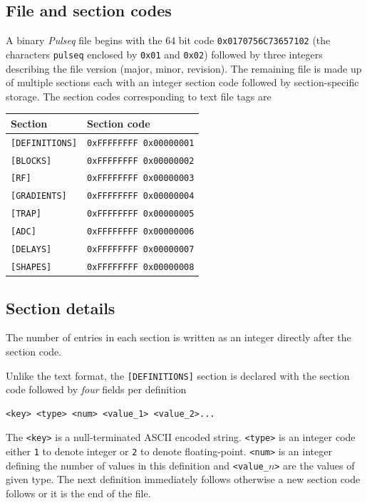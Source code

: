 \documentclass{article}
\begin{document}
\subsection{File and section codes}

A binary \textit{Pulseq} file begins with the 64 bit code \verb.0x0170756C73657102. (the characters \verb.pulseq. enclosed by \verb.0x01. and \verb.0x02.)  followed by three integers describing the file version (major, minor, revision). The remaining file is made up of multiple sections each with an integer section code followed by section-specific storage. The section codes corresponding to text file tags are

\begin{center}
\begin{tabular}{ll}
\toprule
Section & Section code \\
\midrule
\verb.[DEFINITIONS]. & \verb.0xFFFFFFFF 0x00000001. \\
\verb.[BLOCKS]. & \verb.0xFFFFFFFF 0x00000002. \\
\verb.[RF]. & \verb.0xFFFFFFFF 0x00000003. \\
\verb.[GRADIENTS]. & \verb.0xFFFFFFFF 0x00000004. \\
\verb.[TRAP]. & \verb.0xFFFFFFFF 0x00000005. \\
\verb.[ADC]. & \verb.0xFFFFFFFF 0x00000006. \\
\verb.[DELAYS]. & \verb.0xFFFFFFFF 0x00000007. \\
\verb.[SHAPES]. & \verb.0xFFFFFFFF 0x00000008. \\
\bottomrule
\end{tabular}
\end{center}

\subsection{Section details}

The number of entries in each section is written as an integer directly after the section code.

Unlike the text format, the \verb.[DEFINITIONS]. section is declared with the section code followed by \emph{four} fields per definition
\begin{lstlisting}
<key> <type> <num> <value_1> <value_2>...
\end{lstlisting}
The \verb.<key>. is a null-terminated ASCII encoded string. \verb.<type>. is an integer code either \verb.1. to denote integer or \verb.2. to denote floating-point. \verb.<num>. is an integer defining the number of values in this definition and \verb.<value_.$n$\verb.>. are the values of given type. The next definition immediately follows otherwise a new section code follows or it is the end of the file.
\end{document}
